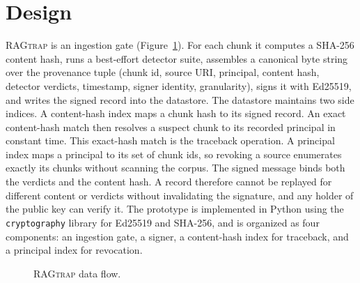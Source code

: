 \documentclass[12pt]{article}
\newcommand{\sysname}{\textsc{RAGtrap}\xspace}
\begin{document}
\section{Design}\label{sec:design}

\sysname{} is an ingestion gate (Figure~\ref{fig:arch}). For each chunk it
computes a SHA-256 content hash, runs a best-effort detector suite, assembles a
canonical byte string over the provenance tuple (chunk id, source URI,
principal, content hash, detector verdicts, timestamp, signer identity,
granularity), signs it with Ed25519, and writes the signed record into the
datastore. The datastore maintains two side indices. A content-hash index maps a
chunk hash to its signed record. An exact content-hash match then resolves a
suspect chunk to its recorded principal in constant time. This exact-hash match
is the traceback operation. A principal index maps a principal to its set of
chunk ids, so revoking a source enumerates exactly its chunks without scanning
the corpus. The signed message binds both the verdicts and the content hash. A
record therefore cannot be replayed for different content or verdicts without
invalidating the signature, and any holder of the public key can verify it.
The prototype is implemented in Python using the \texttt{cryptography} library
for Ed25519 and SHA-256, and is organized as four components: an ingestion gate,
a signer, a content-hash index for traceback, and a principal index for
revocation.

\begin{figure}[htbp]
\centering
\footnotesize
{}
\caption{\sysname{} data flow.}
\label{fig:arch}
\end{figure}
\end{document}
